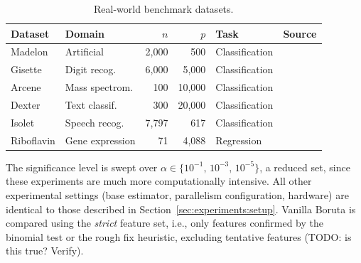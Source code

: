 \documentclass[runningheads]{llncs}
\newcommand{\addcite}[1]{\todo[inline,color=blue!20]{CITE: #1}}
\begin{document}
\begin{table}[H]
\centering
\caption{Real-world benchmark datasets.}
\label{tab:realworld_datasets}
\begin{tabular}{llrrll}
\toprule
Dataset    & Domain          & $n$    & $p$      & Task           & Source \\
\midrule
Madelon    & Artificial      & 2{,}000  & 500      & Classification & \cite{guyon2004result} \\
Gisette    & Digit recog.    & 6{,}000  & 5{,}000  & Classification & \cite{guyon2004result} \\
Arcene     & Mass spectrom.  & 100      & 10{,}000 & Classification & \cite{guyon2004result} \\
Dexter     & Text classif.   & 300      & 20{,}000 & Classification & \cite{guyon2004result} \\
Isolet     & Speech recog.   & 7{,}797  & 617      & Classification & \cite{uci2017} \\
Riboflavin & Gene expression & 71       & 4{,}088  & Regression     & \cite{buhlmann2014hdi} \\
\bottomrule
\end{tabular}
\end{table}

 
The significance level is swept over $\alpha \in \{10^{-1},\, 10^{-3},\, 10^{-5}\}$, a reduced set, since  these experiments are much more computationally intensive. All other experimental settings (base estimator, parallelism configuration, hardware) are identical to those described in Section~\ref{sec:experiments:setup}. Vanilla Boruta is compared using the \emph{strict} feature set, i.e., only features confirmed by the binomial test or the rough fix heuristic, excluding tentative features (TODO: is this true? Verify).
 
\end{document}
